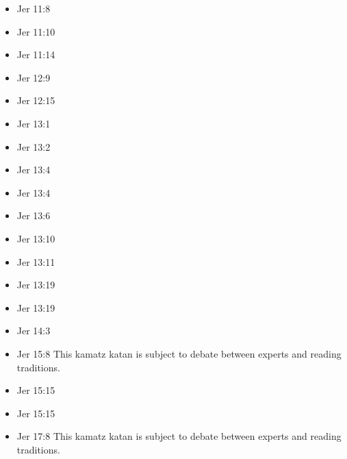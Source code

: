 \documentclass[14pt]{article}
\begin{document}
\begin{multicols}{2}
\begin{itemize}
						\item Jer 11:8
						
						\item Jer 11:10
						
						\item Jer 11:14
						
						\item Jer 12:9
						
						\item Jer 12:15
						
						\item Jer 13:1
						
						\item Jer 13:2
						
						\item Jer 13:4
						
						\item Jer 13:4
						
						\item Jer 13:6
						
						\item Jer 13:10
						
						\item Jer 13:11
						
						\item Jer 13:19
						
						\item Jer 13:19
						
						\item Jer 14:3
						
						\item Jer 15:8 This kamatz katan is subject to debate between experts and reading traditions.
						
						\item Jer 15:15
						
						\item Jer 15:15
						
						\item Jer 17:8 This kamatz katan is subject to debate between experts and reading traditions.
						

\end{itemize}
\end{multicols}
\end{document}
